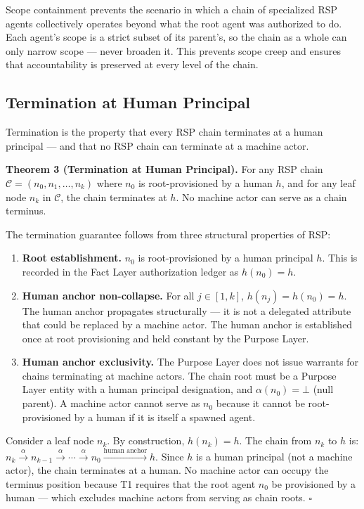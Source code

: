 Scope containment prevents the scenario in which a chain of specialized RSP agents collectively operates beyond what the root agent was authorized to do. Each agent's scope is a strict subset of its parent's, so the chain as a whole can only narrow scope — never broaden it. This prevents scope creep and ensures that accountability is preserved at every level of the chain.

\subsection{Termination at Human Principal}
\label{sec:rs-termination}

Termination is the property that every RSP chain terminates at a human principal — and that no RSP chain can terminate at a machine actor.

\begin{mdframed}[style=theorem]
\textbf{Theorem 3 (Termination at Human Principal).}
For any RSP chain $\mathcal{C} = (n_0, n_1, \ldots, n_k)$ where $n_0$ is root-provisioned by a human $h$, and for any leaf node $n_k$ in $\mathcal{C}$, the chain terminates at $h$. No machine actor can serve as a chain terminus.
\end{mdframed}

\begin{Proof}
The termination guarantee follows from three structural properties of RSP:

\begin{enumerate}
    \item[(T1)] \textbf{Root establishment.} $n_0$ is root-provisioned by a human principal $h$. This is recorded in the Fact Layer authorization ledger as $h(n_0) = h$.
    \item[(T2)] \textbf{Human anchor non-collapse.} For all $j \in [1, k]$, $h(n_j) = h(n_0) = h$. The human anchor propagates structurally — it is not a delegated attribute that could be replaced by a machine actor. The human anchor is established once at root provisioning and held constant by the Purpose Layer.
    \item[(T3)] \textbf{Human anchor exclusivity.} The Purpose Layer does not issue warrants for chains terminating at machine actors. The chain root must be a Purpose Layer entity with a human principal designation, and $\alpha(n_0) = \bot$ (null parent). A machine actor cannot serve as $n_0$ because it cannot be root-provisioned by a human if it is itself a spawned agent.
\end{enumerate}

Consider a leaf node $n_k$. By construction, $h(n_k) = h$. The chain from $n_k$ to $h$ is: $n_k \xrightarrow{\alpha} n_{k-1} \xrightarrow{\alpha} \cdots \xrightarrow{\alpha} n_0 \xrightarrow{\text{human anchor}} h$. Since $h$ is a human principal (not a machine actor), the chain terminates at a human. No machine actor can occupy the terminus position because T1 requires that the root agent $n_0$ be provisioned by a human — which excludes machine actors from serving as chain roots. $\square$
\end{Proof}

